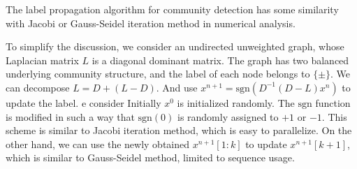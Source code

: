 \documentclass{ctexart}
\begin{document}
The label propagation algorithm for
community detection has some similarity with
Jacobi or Gauss-Seidel iteration method
in numerical analysis.

To simplify the discussion, we consider an undirected unweighted graph, whose Laplacian matrix $L$ is a
diagonal dominant matrix. The graph has two balanced underlying community structure,
and the label of each node belongs to $\{\pm\}$.
We can decompose $L=D+(L-D)$.
And use $x^{n+1} = \mathrm{sgn}(D^{-1}(D-L)x^n)$ to update the label.
e consider 
Initially $x^0$ is initialized randomly. The $\mathrm{sgn}$
function is modified in such a way that $\mathrm{sgn}(0)$ is randomly
assigned to $+1$ or $-1$. This scheme is similar to Jacobi iteration method,
which is easy to parallelize. On the other hand, we can use the newly obtained $x^{n+1}[1:k]$
to update $x^{n+1}[k+1]$, which is similar to Gauss-Seidel method, limited to sequence usage.
\end{document}
